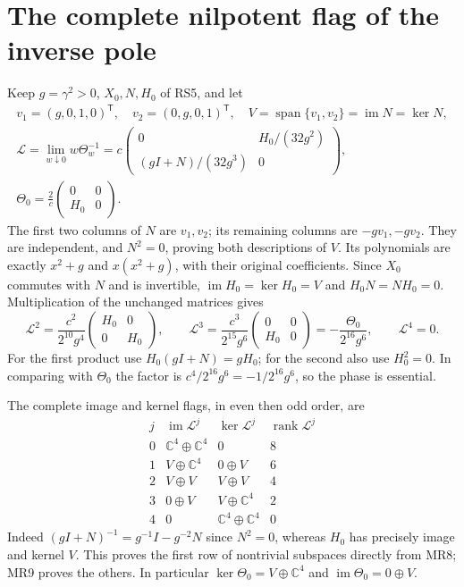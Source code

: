 \documentclass[11pt]{article}
\newcommand{\C}{\mathbb C}
\begin{document}
\section{The complete nilpotent flag of the inverse pole}
Keep $g=\gamma^2>0$, $X_0,N,H_0$ of RS5, and let
\begin{equation}
 \begin{gathered}
 v_1=(g,0,1,0)^{\mathsf T},\quad
 v_2=(0,g,0,1)^{\mathsf T},\quad
 V=\operatorname{span}\{v_1,v_2\}=\operatorname{im}N=\ker N,\\
 \mathscr L=\lim_{w\downarrow0}w\Theta_w^{-1}
 =c\begin{pmatrix}0&H_0/(32g^2)\\(gI+N)/(32g^3)&0\end{pmatrix},\\
 \Theta_0=\frac2c\begin{pmatrix}0&0\\H_0&0\end{pmatrix}.
 \end{gathered}\tag{MR8}
\end{equation}
The first two columns of $N$ are $v_1,v_2$; its remaining
columns are $-gv_1,-gv_2$. They are independent, and $N^2=0$,
proving both descriptions of $V$. Its polynomials are exactly
$x^2+g$ and $x(x^2+g)$, with their original coefficients.
Since $X_0$ commutes with $N$ and is invertible,
$\operatorname{im}H_0=\ker H_0=V$ and $H_0N=NH_0=0$.
Multiplication of the unchanged matrices gives
\begin{equation}
 \mathscr L^2=\frac{c^2}{2^{10}g^4}
            \begin{pmatrix}H_0&0\\0&H_0\end{pmatrix},\qquad
 \mathscr L^3=\frac{c^3}{2^{15}g^6}
            \begin{pmatrix}0&0\\H_0&0\end{pmatrix}
       =-\frac{\Theta_0}{2^{16}g^6},\qquad
 \mathscr L^4=0.
 \tag{MR9}
\end{equation}
For the first product use $H_0(gI+N)=gH_0$; for the second
also use $H_0^2=0$. In comparing with $\Theta_0$ the factor
is $c^4/2^{16}g^6=-1/2^{16}g^6$, so the phase is essential.

The complete image and kernel flags, in even then odd order, are
\begin{equation}
 \begin{array}{c|c|c|c}
 j&\operatorname{im}\mathscr L^j&\ker\mathscr L^j&
     \operatorname{rank}\mathscr L^j\\\hline
 0&\C^4\oplus\C^4&0&8\\
 1&V\oplus\C^4&0\oplus V&6\\
 2&V\oplus V&V\oplus V&4\\
 3&0\oplus V&V\oplus\C^4&2\\
 4&0&\C^4\oplus\C^4&0
 \end{array}
 \tag{MR10}
\end{equation}
Indeed $(gI+N)^{-1}=g^{-1}I-g^{-2}N$ since $N^2=0$,
whereas $H_0$ has precisely image and kernel $V$. This proves
the first row of nontrivial subspaces directly from MR8;
MR9 proves the others. In particular
$\ker\Theta_0=V\oplus\C^4$ and
$\operatorname{im}\Theta_0=0\oplus V$.
\end{document}
